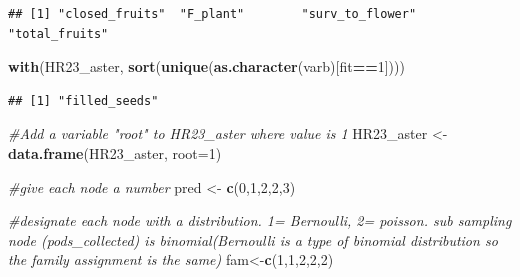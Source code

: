 \documentclass[
]{article}
\newenvironment{Shaded}{\begin{snugshade}}{\end{snugshade}}
\newcommand{\AttributeTok}[1]{\textcolor[rgb]{0.13,0.29,0.53}{#1}}
\newcommand{\CommentTok}[1]{\textcolor[rgb]{0.56,0.35,0.01}{\textit{#1}}}
\newcommand{\DecValTok}[1]{\textcolor[rgb]{0.00,0.00,0.81}{#1}}
\newcommand{\FunctionTok}[1]{\textcolor[rgb]{0.13,0.29,0.53}{\textbf{#1}}}
\newcommand{\NormalTok}[1]{#1}
\newcommand{\OtherTok}[1]{\textcolor[rgb]{0.56,0.35,0.01}{#1}}
\newcommand{\SpecialCharTok}[1]{\textcolor[rgb]{0.81,0.36,0.00}{\textbf{#1}}}
\newcommand{\StringTok}[1]{\textcolor[rgb]{0.31,0.60,0.02}{#1}}
\begin{document}
\begin{Shaded}
\end{Shaded}

\begin{verbatim}
## [1] "closed_fruits"  "F_plant"        "surv_to_flower" "total_fruits"
\end{verbatim}

\begin{Shaded}
\begin{Highlighting}[]
\FunctionTok{with}\NormalTok{(HR23\_aster, }\FunctionTok{sort}\NormalTok{(}\FunctionTok{unique}\NormalTok{(}\FunctionTok{as.character}\NormalTok{(varb)[fit}\SpecialCharTok{==}\DecValTok{1}\NormalTok{])))}
\end{Highlighting}
\end{Shaded}

\begin{verbatim}
## [1] "filled_seeds"
\end{verbatim}

\begin{Shaded}
\begin{Highlighting}[]
\CommentTok{\#Add a variable "root" to HR23\_aster where value is 1}
\NormalTok{HR23\_aster }\OtherTok{\textless{}{-}} \FunctionTok{data.frame}\NormalTok{(HR23\_aster, }\AttributeTok{root=}\DecValTok{1}\NormalTok{)}

\CommentTok{\#give each node a number}
\NormalTok{pred }\OtherTok{\textless{}{-}} \FunctionTok{c}\NormalTok{(}\DecValTok{0}\NormalTok{,}\DecValTok{1}\NormalTok{,}\DecValTok{2}\NormalTok{,}\DecValTok{2}\NormalTok{,}\DecValTok{3}\NormalTok{)}

\CommentTok{\#designate each node with a distribution. 1= Bernoulli, 2= poisson. sub sampling node (pods\_collected) is binomial(Bernoulli is a type of binomial distribution so the family assignment is the same)}
\NormalTok{fam}\OtherTok{\textless{}{-}}\FunctionTok{c}\NormalTok{(}\DecValTok{1}\NormalTok{,}\DecValTok{1}\NormalTok{,}\DecValTok{2}\NormalTok{,}\DecValTok{2}\NormalTok{,}\DecValTok{2}\NormalTok{)}
\end{Highlighting}
\end{Shaded}
\end{document}
